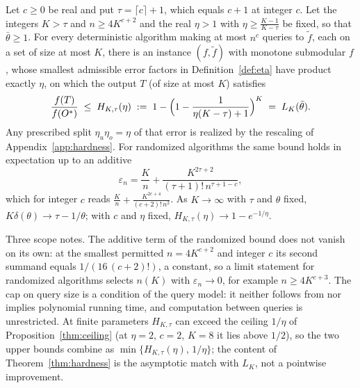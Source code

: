 \begin{theorem}\label{thm:hardness}
Let $c\ge0$ be real and put $\tau=\lceil c\rceil+1$, which equals $c+1$ at
integer $c$.  Let the integers
$K>\tau$ and $n\ge4K^{c+2}$ and the real $\eta>1$ with
$\eta\ge\tfrac{K-1}{K-\tau}$ be fixed, so that $\bar\theta\ge1$.  For every
deterministic algorithm making at most $n^{c}$ queries to $\tilde f$, each on
a set of size at most $K$, there is an instance $(f,\tilde f)$ with monotone
submodular $f$, whose smallest admissible error factors in
Definition~\ref{def:eta} have product exactly $\eta$, on which the output $T$
(of size at most $K$) satisfies
\[
  \frac{f(T)}{f(O^{\ast})}\;\le\;
  H_{K,\tau}(\eta)\;:=\;
  1-\Bigl(1-\frac{1}{\eta(K-\tau)+1}\Bigr)^{K}\;=\;L_K(\bar\theta).
\]
Any prescribed split $\eta_u\eta_o=\eta$ of that error is realized by the
rescaling of Appendix~\ref{app:hardness}.  For randomized algorithms the same
bound holds in expectation up to an additive
\[
  \varepsilon_n=\frac Kn+\frac{K^{2\tau+2}}{(\tau+1)!\,n^{\tau+1-c}},
\]
which for integer $c$ reads $\tfrac Kn+\tfrac{K^{2c+4}}{(c+2)!\,n^{2}}$.  As
$K\to\infty$ with $\tau$ and $\theta$ fixed, $K\delta(\theta)\to\tau-1/\theta$;
with $c$ and $\eta$ fixed, $H_{K,\tau}(\eta)\to1-e^{-1/\eta}$.
\end{theorem}
Three scope notes.  The additive term of the randomized bound does not
vanish on its own: at the smallest permitted $n=4K^{c+2}$ and integer $c$
its second summand equals $1/(16\,(c+2)!)$, a constant, so a limit
statement for randomized algorithms selects $n(K)$ with
$\varepsilon_n\to0$, for example $n\ge4K^{c+3}$.  The cap on query size is
a condition of the query model: it neither follows from nor implies
polynomial running time, and computation between queries is unrestricted.
At finite parameters $H_{K,\tau}$ can exceed the ceiling $1/\eta$ of
Proposition~\ref{thm:ceiling} (at $\eta=2$, $c=2$, $K=8$ it lies above $1/2$),
so the two upper bounds combine as $\min\{H_{K,\tau}(\eta),\,1/\eta\}$;
the content of Theorem~\ref{thm:hardness} is the asymptotic match with
$L_K$, not a pointwise improvement.
